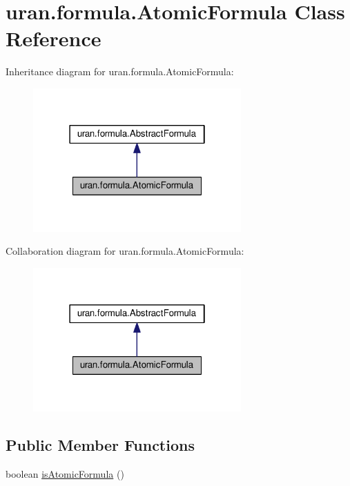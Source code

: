 \hypertarget{classuran_1_1formula_1_1_atomic_formula}{}\section{uran.\+formula.\+Atomic\+Formula Class Reference}
\label{classuran_1_1formula_1_1_atomic_formula}


Inheritance diagram for uran.\+formula.\+Atomic\+Formula\+:
\nopagebreak
\begin{figure}[H]
\begin{center}
\leavevmode
\includegraphics[width=226pt]{classuran_1_1formula_1_1_atomic_formula__inherit__graph}
\end{center}
\end{figure}


Collaboration diagram for uran.\+formula.\+Atomic\+Formula\+:
\nopagebreak
\begin{figure}[H]
\begin{center}
\leavevmode
\includegraphics[width=226pt]{classuran_1_1formula_1_1_atomic_formula__coll__graph}
\end{center}
\end{figure}
\subsection*{Public Member Functions}
\begin{DoxyCompactItemize}
\item 
boolean \hyperlink{classuran_1_1formula_1_1_atomic_formula_a6884c3d5cbce1b9f4afe887fe041373b}{is\+Atomic\+Formula} ()
\end{DoxyCompactItemize}


